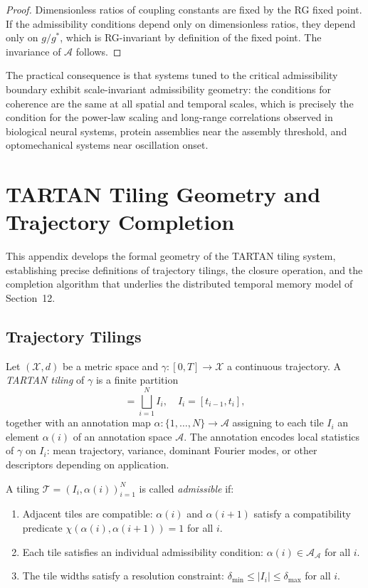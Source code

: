\documentclass[11pt, oneside]{article}
\numberwithin{equation}{section}
\theoremstyle{rsvpstyle}
\theoremstyle{remark}
\newcommand{\Adm}{\mathcal{A}}
\begin{document}
\begin{proof}
Dimensionless ratios of coupling constants are fixed by the RG fixed point. If the
admissibility conditions depend only on dimensionless ratios, they depend only on
$g/g^*$, which is RG-invariant by definition of the fixed point. The invariance of
$\Adm$ follows.
\end{proof}

The practical consequence is that systems tuned to the critical admissibility boundary
exhibit scale-invariant admissibility geometry: the conditions for coherence are the
same at all spatial and temporal scales, which is precisely the condition for the
power-law scaling and long-range correlations observed in biological neural systems,
protein assemblies near the assembly threshold, and optomechanical systems near
oscillation onset.


\section{TARTAN Tiling Geometry and Trajectory Completion}
\label{app:tartan}

This appendix develops the formal geometry of the TARTAN tiling system, establishing
precise definitions of trajectory tilings, the closure operation, and the completion
algorithm that underlies the distributed temporal memory model of Section~12.

\subsection{Trajectory Tilings}

Let $(\mathcal{X}, d)$ be a metric space and $\gamma : [0,T] \to \mathcal{X}$ a
continuous trajectory. A \emph{TARTAN tiling} of $\gamma$ is a finite partition
\begin{equation}
  [0,T] = \bigsqcup_{i=1}^N I_i, \quad I_i = [t_{i-1}, t_i],
\end{equation}
together with an annotation map $\alpha : \{1, \ldots, N\} \to \mathcal{A}$
assigning to each tile $I_i$ an element $\alpha(i)$ of an annotation space $\mathcal{A}$.
The annotation encodes local statistics of $\gamma$ on $I_i$: mean trajectory,
variance, dominant Fourier modes, or other descriptors depending on application.

A tiling $\mathcal{T} = (I_i, \alpha(i))_{i=1}^N$ is called \emph{admissible} if:
\begin{enumerate}[label=(\roman*)]
  \item Adjacent tiles are compatible: $\alpha(i)$ and $\alpha(i+1)$ satisfy a
    compatibility predicate $\chi(\alpha(i), \alpha(i+1)) = 1$ for all $i$.
  \item Each tile satisfies an individual admissibility condition:
    $\alpha(i) \in \Adm_\mathcal{A}$ for all $i$.
  \item The tile widths satisfy a resolution constraint:
    $\delta_\text{min} \leq |I_i| \leq \delta_\text{max}$ for all $i$.
\end{enumerate}
\end{document}
